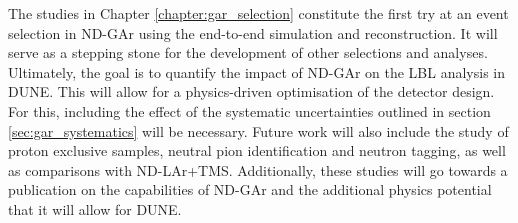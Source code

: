 \begin{comment}
Finally, in Chapter \ref{chapter:gar_selection} I apply to the event selection in ND-GAr. I start by describing a method for selecting $\nu_{\mu}$ CC events in section \ref{sec:gar_numu_cc}. This is mainly based on the muon score derived from the muon/pion classification I developed. Additionally, I perform an optimisation of the FV. As part of this study, I also examined the kinematics of the selected primary muon and the reconstructed interaction vertex. Next, in section \ref{sec:gar_charged_pions} I explore the capabilities of ND-GAr and its reconstruction at identifying charged pions. I optimise a selection based on the reconstructed charged pion multiplicity, for events with 0, 1, 2, and $\geq 3 \pi^{\pm}$ in the final state. I the performance of the selection as a function of the truth hadronic invariant mass, as well as the true pion kinematics for the $\nu_{\mu}$ CC $1\pi^{\pm}$ case. I briefly discuss the possibility of tagging events with neutral pions by reconstructing the invariant mass of the photon pairs from their decay in section \ref{sec:gar_neutral_pions}. Lastly, in section \ref{sec:gar_energy} I study the neutrino energy reconstruction of the selected $\nu_{\mu}$ CC events using a calorimetric approach. For this, I compare the values obtained using generator-level and reconstructed information.

These studies constitute the first try at an event selection in ND-GAr using full simulation and reconstruction. It will serve as a stepping stone for the development of other selections and analyses. Ultimately, the goal is to quantify the impact of ND-GAr on the LBL analysis in DUNE. For this, including the effect of the systematic uncertainties outlined in section \ref{sec:gar_systematics} will be necessary.
\end{comment}

The studies in Chapter \ref{chapter:gar_selection} constitute the first try at an event selection in ND-GAr using the end-to-end simulation and reconstruction. It will serve as a stepping stone for the development of other selections and analyses. Ultimately, the goal is to quantify the impact of ND-GAr on the LBL analysis in DUNE. This will allow for a physics-driven optimisation of the detector design. For this, including the effect of the systematic uncertainties outlined in section \ref{sec:gar_systematics} will be necessary. Future work will also include the study of proton exclusive samples, neutral pion identification and neutron tagging, as well as comparisons with ND-LAr+TMS. Additionally, these studies will go towards a publication on the capabilities of ND-GAr and the additional physics potential that it will allow for DUNE.

